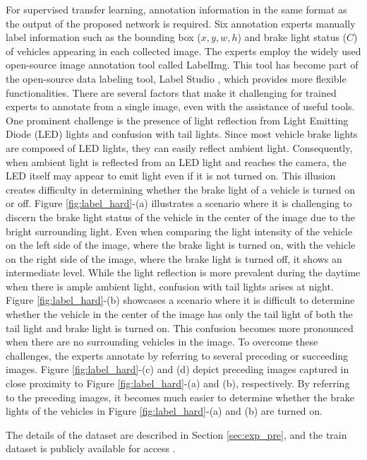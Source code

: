 For supervised transfer learning, annotation information in the same format as the output of the proposed network is required.
Six annotation experts manually label information such as the bounding box ($x, y, w, h$) and brake light status ($C$) of vehicles appearing in each collected image.
The experts employ the widely used open-source image annotation tool called LabelImg.
This tool has become part of the open-source data labeling tool, Label Studio \cite{Label_Studio}, which provides more flexible functionalities.
There are several factors that make it challenging for trained experts to annotate from a single image, even with the assistance of useful tools.
One prominent challenge is the presence of light reflection from Light Emitting Diode (LED) lights and confusion with tail lights.
Since most vehicle brake lights are composed of LED lights, they can easily reflect ambient light.
Consequently, when ambient light is reflected from an LED light and reaches the camera, the LED itself may appear to emit light even if it is not turned on.
This illusion creates difficulty in determining whether the brake light of a vehicle is turned on or off.
Figure \ref{fig:label_hard}-(a) illustrates a scenario where it is challenging to discern the brake light status of the vehicle in the center of the image due to the bright surrounding light. 
Even when comparing the light intensity of the vehicle on the left side of the image, where the brake light is turned on, with the vehicle on the right side of the image, where the brake light is turned off, it shows an intermediate level.
While the light reflection is more prevalent during the daytime when there is ample ambient light, confusion with tail lights arises at night.
Figure \ref{fig:label_hard}-(b) showcases a scenario where it is difficult to determine whether the vehicle in the center of the image has only the tail light of both the tail light and brake light is turned on.
This confusion becomes more pronounced when there are no surrounding vehicles in the image.
To overcome these challenges, the experts annotate by referring to several preceding or succeeding images. 
Figure \ref{fig:label_hard}-(c) and (d) depict preceding images captured in close proximity to Figure \ref{fig:label_hard}-(a) and (b), respectively.
By referring to the preceding images, it becomes much easier to determine whether the brake lights of the vehicles in Figure \ref{fig:label_hard}-(a) and (b) are turned on.

The details of the dataset are described in Section \ref{sec:exp_pre}, and the train dataset is publicly available for access \cite{brake-light-detection_dataset}.



